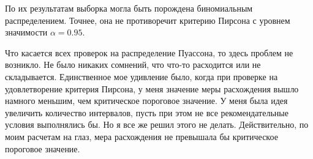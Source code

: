 \documentclass[14pt,a4paper]{scrartcl}
\theoremstyle{definition}
\theoremstyle{remark}
\theoremstyle{definition}
\theoremstyle{definition}
\begin{document}
По их результатам выборка могла быть порождена биномиальным распределением. Точнее, она не противоречит критерию Пирсона с уровнем значимости $\alpha = 0.95$.

Что касается всех проверок на распределение Пуассона, то здесь проблем не возникло. Не было никаких сомнений, что что-то расходится или не складывается. Единственное мое удивление было, когда при проверке на удовлетворение критерия Пирсона, у меня значение меры расхождения вышло намного меньшим, чем критическое пороговое значение. У меня была идея увеличить количество интервалов, пусть при этом не все рекомендательные условия выполнялись бы. Но я все же решил этого не делать. Действительно, по моим расчетам на глаз, мера расхождения не превышала бы критическое пороговое значение.
\end{document}
